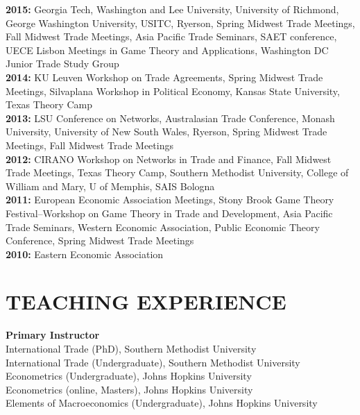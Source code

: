 \documentclass[11pt]{res}
\begin{document}
\begin{resume}

\phantom{.}\vspace{.05cm}
{\bf 2015:} Georgia Tech, Washington and Lee University, University of Richmond, George Washington University, USITC, Ryerson, Spring Midwest Trade Meetings, Fall Midwest Trade Meetings, Asia Pacific Trade Seminars, SAET conference, UECE Lisbon Meetings in Game Theory and Applications, Washington DC Junior Trade Study Group\vspace{1.5mm}\\
{\bf 2014:} KU Leuven Workshop on Trade Agreements, Spring Midwest Trade Meetings, Silvaplana Workshop in Political Economy, Kansas State University, Texas Theory Camp\vspace{1.5mm}\\
{\bf 2013:} LSU Conference on Networks, Australasian Trade Conference, Monash University, University of New South Wales, Ryerson, Spring Midwest Trade Meetings, Fall Midwest Trade Meetings \vspace{1.5mm}\\
{\bf 2012:}  CIRANO Workshop on Networks in Trade and Finance, Fall Midwest Trade Meetings, Texas Theory Camp, Southern Methodist University, College of William and Mary, U of Memphis, SAIS Bologna\vspace{1.5mm}\\
{\bf 2011:} European Economic Association Meetings, Stony Brook Game Theory Festival--Workshop on Game Theory in Trade and Development, Asia Pacific Trade Seminars, Western Economic Association, Public Economic Theory Conference, Spring Midwest Trade Meetings\vspace{1.5mm}\\
{\bf 2010:} Eastern Economic Association \vspace{1.5mm}\\

\section{TEACHING EXPERIENCE} \vspace{1.5mm}
{\bf Primary Instructor}\vspace{1.5mm}\\
International Trade (PhD), Southern Methodist University\vspace{1.5mm}\\
International Trade (Undergraduate), Southern Methodist University\vspace{1.5mm}\\
Econometrics (Undergraduate), Johns Hopkins University\vspace{1.5mm}\\
Econometrics (online, Masters), Johns Hopkins University\vspace{1.5mm}\\
Elements of Macroeconomics (Undergraduate), Johns Hopkins University\vspace{1.5mm}\\


\end{resume}
\end{document}
